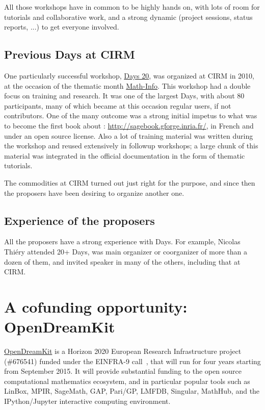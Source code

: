 \documentclass[12pt]{amsbook}
\begin{document}
All those workshops have in common to be highly hands on, with lots of
room for tutorials and collaborative work, and a strong dynamic
(project sessions, status reports, ...) to get everyone involved.

\subsection{Previous \Sage Days at CIRM}

One particularly successful workshop,
\href{https://www.lirmm.fr/arith/wiki/MathInfo2010/SageDays}{\Sage
  Days 20}, was organized at CIRM in 2010, at the occasion of the
thematic month
\href{https://www.lirmm.fr/arith/wiki/MathInfo2010/}{Math-Info}. This
workshop had a double focus on training and research. It was one of
the largest \Sage Days, with about 80 participants, many of which
became at this occasion regular \Sage users, if not contributors. One
of the many outcome was a strong initial impetus to what was to become
the first book about \Sage: \href{Calcul Mathématique avec
  Sage}{http://sagebook.gforge.inria.fr/}, in French and under an open
source license. Also a lot of training material was written during the
workshop and reused extensively in followup workshops; a large chunk
of this material was integrated in the \Sage official documentation in
the form of thematic tutorials.

The commodities at CIRM turned out just right for the purpose, and
since then the proposers have been desiring to organize another one.

\subsection{Experience of the proposers}

All the proposers have a strong experience with \Sage Days. For
example, Nicolas Thiéry attended 20+ \Sage Days, was main organizer or
coorganizer of more than a dozen of them, and invited speaker in many
of the others, including that at CIRM.

\section{A cofunding opportunity: OpenDreamKit}

\href{http://opendreamkit.org}{OpenDreamKit} is a Horizon 2020
European Research Infrastructure project (\#676541) funded under the
EINFRA-9 call~\cite{EINFRA-9}, that will run for four years starting
from September 2015. It will provide substantial funding to the open
source computational mathematics ecosystem, and in particular popular
tools such as LinBox, MPIR, SageMath, GAP, Pari/GP, LMFDB, Singular,
MathHub, and the IPython/Jupyter interactive computing environment.
\end{document}
